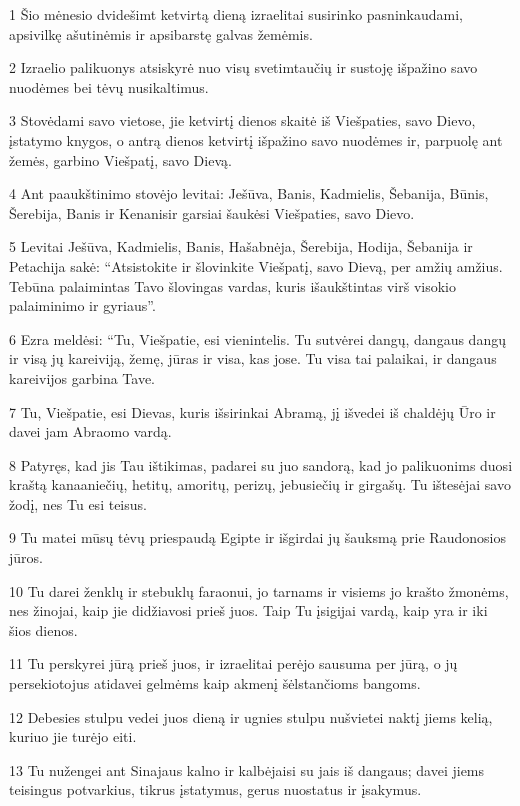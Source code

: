 \par 1 Šio mėnesio dvidešimt ketvirtą dieną izraelitai susirinko pasninkaudami, apsivilkę ašutinėmis ir apsibarstę galvas žemėmis. 
\par 2 Izraelio palikuonys atsiskyrė nuo visų svetimtaučių ir sustoję išpažino savo nuodėmes bei tėvų nusikaltimus. 
\par 3 Stovėdami savo vietose, jie ketvirtį dienos skaitė iš Viešpaties, savo Dievo, įstatymo knygos, o antrą dienos ketvirtį išpažino savo nuodėmes ir, parpuolę ant žemės, garbino Viešpatį, savo Dievą. 
\par 4 Ant paaukštinimo stovėjo levitai: Ješūva, Banis, Kadmielis, Šebanija, Būnis, Šerebija, Banis ir Kenanis­ir garsiai šaukėsi Viešpaties, savo Dievo. 
\par 5 Levitai Ješūva, Kadmielis, Banis, Hašabnėja, Šerebija, Hodija, Šebanija ir Petachija sakė: “Atsistokite ir šlovinkite Viešpatį, savo Dievą, per amžių amžius. Tebūna palaimintas Tavo šlovingas vardas, kuris išaukštintas virš visokio palaiminimo ir gyriaus”. 
\par 6 Ezra meldėsi: “Tu, Viešpatie, esi vienintelis. Tu sutvėrei dangų, dangaus dangų ir visą jų kareiviją, žemę, jūras ir visa, kas jose. Tu visa tai palaikai, ir dangaus kareivijos garbina Tave. 
\par 7 Tu, Viešpatie, esi Dievas, kuris išsirinkai Abramą, jį išvedei iš chaldėjų Ūro ir davei jam Abraomo vardą. 
\par 8 Patyręs, kad jis Tau ištikimas, padarei su juo sandorą, kad jo palikuonims duosi kraštą kanaaniečių, hetitų, amoritų, perizų, jebusiečių ir girgašų. Tu ištesėjai savo žodį, nes Tu esi teisus. 
\par 9 Tu matei mūsų tėvų priespaudą Egipte ir išgirdai jų šauksmą prie Raudonosios jūros. 
\par 10 Tu darei ženklų ir stebuklų faraonui, jo tarnams ir visiems jo krašto žmonėms, nes žinojai, kaip jie didžiavosi prieš juos. Taip Tu įsigijai vardą, kaip yra ir iki šios dienos. 
\par 11 Tu perskyrei jūrą prieš juos, ir izraelitai perėjo sausuma per jūrą, o jų persekiotojus atidavei gelmėms kaip akmenį šėlstančioms bangoms. 
\par 12 Debesies stulpu vedei juos dieną ir ugnies stulpu nušvietei naktį jiems kelią, kuriuo jie turėjo eiti. 
\par 13 Tu nužengei ant Sinajaus kalno ir kalbėjaisi su jais iš dangaus; davei jiems teisingus potvarkius, tikrus įstatymus, gerus nuostatus ir įsakymus. 
